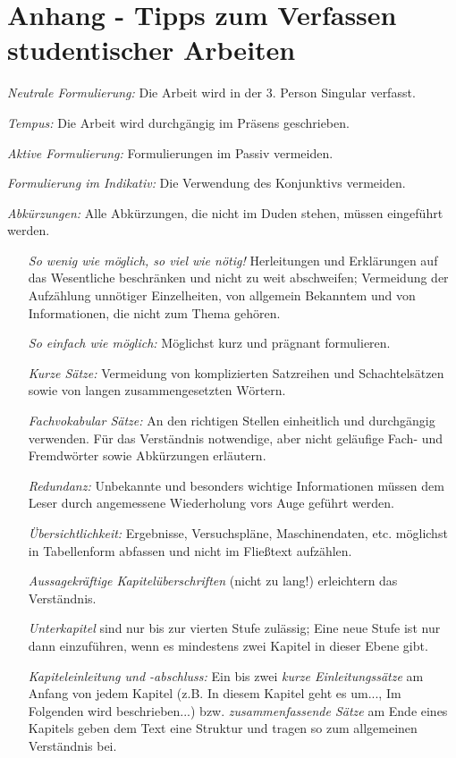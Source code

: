 \chapter{Anhang - Tipps zum Verfassen studentischer Arbeiten}
\begin{compactitem}
\item[\emph{Neutrale Formulierung:}] Die Arbeit wird in der 3. Person Singular verfasst.
\item[\emph{Tempus:}] Die Arbeit wird durchgängig im Präsens geschrieben.
\item[\emph{Aktive Formulierung:}] Formulierungen im Passiv vermeiden.
\item[\emph{Formulierung im Indikativ:}] Die Verwendung des Konjunktivs vermeiden.
\item[\emph{Abkürzungen:}] Alle Abkürzungen, die nicht im Duden stehen, müssen eingeführt werden.
\end{compactitem}
\begin{itemize}
\item[\emph{So wenig wie möglich, so viel wie nötig!}] Herleitungen und Erklärungen auf das Wesentliche beschränken und nicht zu weit abschweifen; Vermeidung der Aufzählung unnötiger Einzelheiten, von allgemein Bekanntem und von Informationen, die nicht zum Thema gehören.
\item[\emph{So einfach wie möglich:}] Möglichst kurz und prägnant formulieren. 
\item[\emph{Kurze Sätze:}] Vermeidung von komplizierten Satzreihen und Schachtelsätzen sowie von langen zusammengesetzten Wörtern.
\item[\emph{Fachvokabular Sätze:}] An den richtigen Stellen einheitlich und durchgängig verwenden. Für das Verständnis notwendige, aber nicht geläufige Fach- und Fremdwörter sowie Abkürzungen erläutern.
\item[\emph{Redundanz:}] Unbekannte und besonders wichtige Informationen müssen dem Leser durch angemessene Wiederholung vors Auge geführt werden. 
\item[\emph{Übersichtlichkeit:}] Ergebnisse, Versuchspläne, Maschinendaten, etc. möglichst in Tabellenform abfassen und nicht im Fließtext aufzählen.
\item[\emph{Aussagekräftige Kapitelüberschriften}] (nicht zu lang!) erleichtern das Verständnis.
\item[\emph{Unterkapitel}] sind nur bis zur vierten Stufe zulässig; Eine neue Stufe ist nur dann einzuführen, wenn es mindestens zwei Kapitel in dieser Ebene gibt.
\item[\emph{Kapiteleinleitung und -abschluss:}] Ein bis zwei \emph{kurze Einleitungssätze} am Anfang von jedem Kapitel (z.B. In diesem Kapitel geht es um..., Im Folgenden wird beschrieben...) bzw. \emph{zusammenfassende Sätze} am Ende eines Kapitels geben dem Text eine Struktur und tragen so zum allgemeinen Verständnis bei.
\end{itemize}

